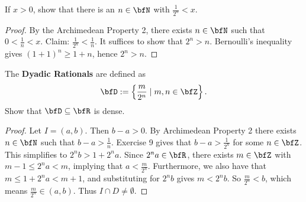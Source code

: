 \documentclass[10pt,twoside,openany]{memoir}
\begin{document}
    \begin{exercise}
        If $x>0$, show that there is an $n \in \bfN$ with $\frac{1}{2^n} <x$.
    \end{exercise}
        \begin{proof}
            By the Archimedean Property 2, there exists $n \in \bfN$ such that $0 < \frac{1}{n} < x$. Claim: $\frac{1}{2^n} < \frac{1}{n}$. It suffices to show that $2^n > n$. Bernoulli's inequality gives $(1+1)^n \geq 1 + n$, hence $2^n > n$.
        \end{proof}
    \begin{exercise}
        The \textbf{Dyadic Rationals} are defined as 
            \begin{equation*}
            \begin{split}
                \bfD := \left\{\frac{m}{2^n} \mid m,n \in \bfZ\right\}.
            \end{split}
            \end{equation*}
        Show that $\bfD \subseteq \bfR$ is dense.
    \end{exercise}
        \begin{proof}
            Let $I = (a,b)$. Then $b-a > 0$. By Archimedean Property 2 there exists $n \in \bfN$ such that $b-a > \frac{1}{n}$. Exercise 9 gives that $b - a > \frac{1}{2^n}$ for some $n \in \bfZ$. This simplifies to $2^nb > 1 + 2^na$. Since $2^na \in \bfR$, there exists $m \in \bfZ$ with $m-1 \leq 2^na < m$, implying that $a < \frac{m}{2^n}$. Furthermore, we also have that $m \leq 1 + 2^n a < m+1$, and substituting for $2^n b$ gives $m < 2^n b$. So $\frac{m}{2^n} < b$, which means $\frac{m}{2^n} \in (a,b)$. Thus $I \cap D \neq \emptyset$.
        \end{proof}
\end{document}
